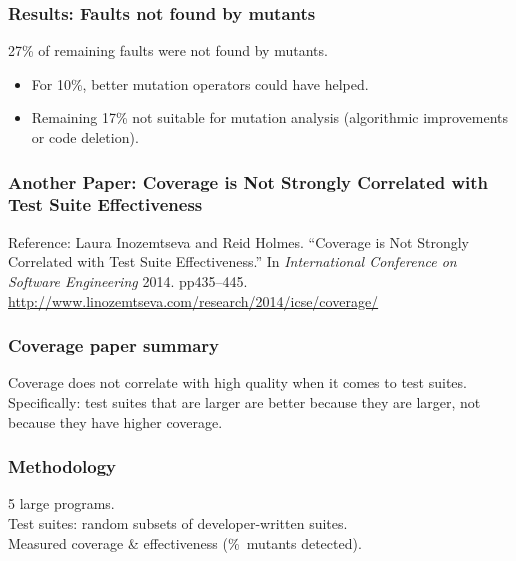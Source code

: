 \documentclass{beamer}
\newenvironment{changemargin}[1]{%
  \begin{list}{}{%
    \setlength{\topsep}{0pt}%
    \setlength{\leftmargin}{#1}%
    \setlength{\rightmargin}{1em}
    \setlength{\listparindent}{\parindent}%
    \setlength{\itemindent}{\parindent}%
    \setlength{\parsep}{\parskip}%
  }%
  \item[]}{\end{list}}
\begin{document}
\begin{frame}
  \frametitle{Results: Faults not found by mutants}
  \Large
  \begin{changemargin}{2em}
    27\% of remaining faults were not found by mutants.\\[1em]
    \begin{itemize}
    \item For 10\%, better mutation operators could have helped.
    \item Remaining 17\% not suitable for mutation analysis (algorithmic improvements or code deletion).
    \end{itemize}
  \end{changemargin}
\end{frame}
    

\begin{frame}
  \frametitle{Another Paper: Coverage is Not Strongly Correlated with Test Suite Effectiveness}

  \begin{changemargin}{2em}
  Reference: Laura Inozemtseva and Reid Holmes.
``Coverage is Not Strongly Correlated with Test Suite Effectiveness.''
In {\em International Conference on Software Engineering} 2014. pp435--445.
\url{http://www.linozemtseva.com/research/2014/icse/coverage/}
  \end{changemargin}

\end{frame}

\begin{frame}
  \frametitle{Coverage paper summary}

  \Large
  \begin{changemargin}{2em}
Coverage does not correlate with high quality
when it comes to test suites.\\[1em]

Specifically: test suites that are larger are better because
they are larger, not because they have higher coverage.
  \end{changemargin}
\end{frame}

\begin{frame}
  \frametitle{Methodology}

  \Large
  \begin{changemargin}{2em}
    5 large programs.\\
    Test suites: random subsets of developer-written suites.\\[1em]
    Measured coverage \& effectiveness (\%~mutants detected).
  \end{changemargin}

\end{frame}
\end{document}
